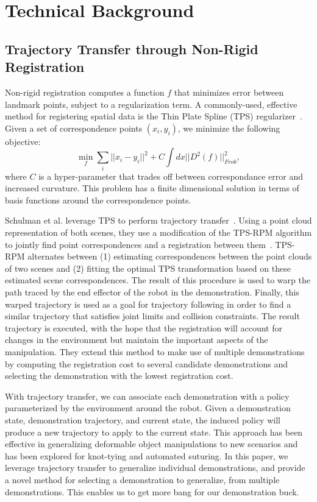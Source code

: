 \section{Technical Background}

\subsection{Trajectory Transfer through Non-Rigid Registration}
Non-rigid registration computes a function $f$ that minimizes error between landmark points, subject to a regularization term.
A commonly-used, effective method for registering spatial data is the Thin Plate Spline (TPS) regularizer~\cite{Carr_SIGGRAPH2001, Wahba_TPS1990}.
Given a set of correspondence points $(x_i, y_i)$, we minimize the following objective:
$$\min_f \sum_i ||x_i - y_i||^2 + C\int dx ||D^2(f)||^2_{Frob},$$
where $C$ is a hyper-parameter that trades off between correspondance error and increased curvature.
This problem has a finite dimensional solution in terms of basis functions around the correspondence points.

Schulman et al. leverage TPS to perform trajectory transfer~\cite{Schulmanetal_ISRR2013}.
Using a point cloud representation of both scenes, they use a modification of the TPS-RPM algorithm to jointly find point correspondences and a registration between them~\cite{Chui_CVIU2003}.
TPS-RPM alternates between (1) estimating correspondences between the point clouds of two scenes and (2) fitting the optimal TPS transformation based on these estimated scene correspondences. 
The result of this procedure is used to warp the path traced by the end effector of the robot in the demonstration.
Finally, this warped trajectory is used as a goal for trajectory following in order to find a similar trajectory that satisfies joint limits and collision constraints.
The result trajectory is executed, with the hope that the registration will account for changes in the environment but maintain the important aspects of the manipulation.
They extend this method to make use of multiple demonstrations by computing the registration cost to several candidate demonstrations and selecting the demonstration with the lowest registration cost.

With trajectory transfer, we can associate each demonstration with a policy parameterized by the environment around the robot.
Given a demonstration state, demonstration trajectory, and current state, the induced policy will produce a new trajectory to apply to the current state.
This approach has been effective in generalizing deformable object manipulations to new scenarios and has been explored for knot-tying and automated suturing.
In this paper, we leverage trajectory transfer to generalize individual demonstrations, and provide a novel method for selecting a demonstration to generalize, from multiple demonstrations. This enables us to get more bang for our demonstration buck.

